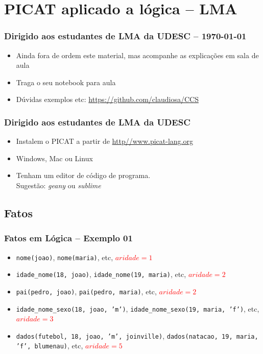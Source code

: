 \documentclass[10pt]{beamer}
\begin{document}

\section{PICAT aplicado a lógica -- LMA}
\begin{frame}
    \frametitle{Dirigido aos estudantes de LMA da UDESC -- \today}
    \begin{itemize}
    \item Ainda fora de ordem este material, mas acompanhe as explicações
    em sala de aula
    
    \item Traga o seu notebook para aula
    \item Dúvidas exemplos etc: \url{https://github.com/claudiosa/CCS}
    \end{itemize}
\end{frame}


\begin{frame}[fragile]
    \frametitle{Dirigido aos estudantes de LMA da UDESC}
    \begin{itemize}
    \item Instalem o PICAT a partir de \url{http//www.picat-lang.org}
    \item Windows, Mac ou Linux
    \item Tenham um editor de código de programa.\\
     Sugestão: \textit{geany} ou \textit{sublime}
    \end{itemize}
\end{frame}


\subsection{Fatos}
\begin{frame}
    \frametitle{Fatos em Lógica  -- Exemplo 01}
    \begin{itemize}
    \item \texttt{nome(joao)}, \texttt{nome(maria)}, etc, \textcolor{red}{$aridade=1$} 
    \item \texttt{idade\_nome(18, joao)}, \texttt{idade\_nome(19, maria)}, etc, \textcolor{red}{$aridade=2$}
    \item \texttt{pai(pedro, joao)}, \texttt{pai(pedro, maria)}, etc, \textcolor{red}{$aridade=2$}
    \item \texttt{idade\_nome\_sexo(18, joao, 'm')}, \texttt{idade\_nome\_sexo(19, maria, 'f')}, etc, \textcolor{red}{$aridade=3$}
    \item \texttt{dados(futebol, 18, joao, 'm', joinville)}, \texttt{dados(natacao, 19, maria, 'f', blumenau)}, etc, \textcolor{red}{$aridade=5$}
    \end{itemize}
\end{frame}
\end{document}
